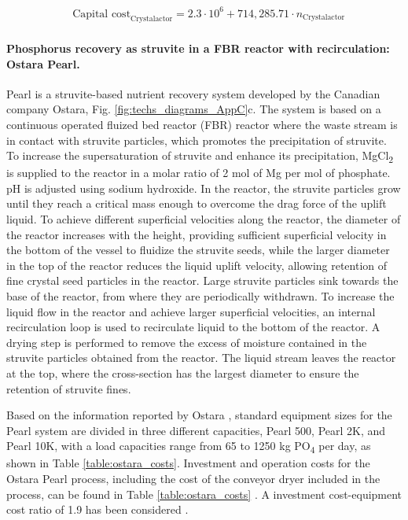 \begin{refsection}[referencesCh4]
\begin{align}
& \text{Capital cost}_{\text{Crystalactor}}= 2.3 \cdot 10^{6} + 714,285.71 \cdot n_{\text{Crystalactor}} \label{eq:capital_cost_crystalactor_AppC}
\end{align}

\paragraph{Phosphorus recovery as struvite in a FBR reactor with recirculation: Ostara Pearl.}
Pearl is a struvite-based nutrient recovery system developed by the Canadian company Ostara, Fig. \ref{fig:techs_diagrams_AppC}c. The system is based on a continuous operated fluized bed reactor (FBR) reactor where the waste stream is in contact with struvite particles, which promotes the precipitation of struvite. To increase the supersaturation of struvite and enhance its precipitation, MgCl\textsubscript{2} is supplied to the reactor in a molar ratio of 2 mol of Mg per mol of phosphate. pH is adjusted using sodium hydroxide. In the reactor, the struvite particles grow until they reach a critical mass enough to overcome the drag force of the uplift liquid. To achieve different superficial velocities along the reactor, the diameter of the reactor increases with the height, providing sufficient superficial velocity in the bottom of the vessel to fluidize the struvite seeds, while the larger diameter in the top of the reactor reduces the liquid uplift velocity, allowing retention of fine crystal seed particles in the reactor. Large struvite particles sink towards the base of the reactor, from where they are periodically withdrawn. To increase the liquid flow in the reactor and achieve larger superficial velocities, an internal recirculation loop is used to recirculate liquid to the bottom of the reactor. A drying step is performed to remove the excess of moisture contained in the struvite particles obtained from the reactor. The liquid stream leaves the reactor at the top, where the cross-section has the largest diameter to ensure the retention of struvite fines.

Based on the information reported by Ostara \citep{Pearl2Kcost2}, standard equipment sizes for the Pearl system are divided in three different capacities, Pearl 500, Pearl 2K, and Pearl 10K, with a load capacities range from 65 to 1250 kg PO\textsubscript{4} per day, as shown in Table \ref{table:ostara_costs}. Investment and operation costs for the Ostara Pearl process, including the cost of the conveyor dryer included in the process, can be found in Table \ref{table:ostara_costs} \citep{Pearl500cost1, Pearl2Kcost1, Pearl2Kcost2, Pearl10Kcost1}. A investment cost-equipment cost ratio of 1.9 has been considered \citep{Pearl2Kcost2}.


\end{refsection}
